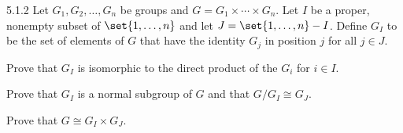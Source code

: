 \begin{exercise}{5.1.2}
    Let $G_1, G_2, \ldots, G_n$ be groups and $G = G_1 \times \cdots \times G_n$.
	Let $I$ be a proper, nonempty subset of $\set{1, \ldots, n}$ and let $J = \set{1, \ldots, n} - I$.
	Define $G_I$ to be the set of elements of $G$ that have the identity $G_j$ in position $j$ for all $j \in J$.
    \begin{subexercises}
        \item Prove that $G_I$ is isomorphic to the direct product of the $G_i$ for $i \in I$.
        \item Prove that $G_I$ is a normal subgroup of $G$ and that $G/G_I \cong G_J$.
        \item Prove that $G \cong G_I \times G_J$.
    \end{subexercises}
\end{exercise}


